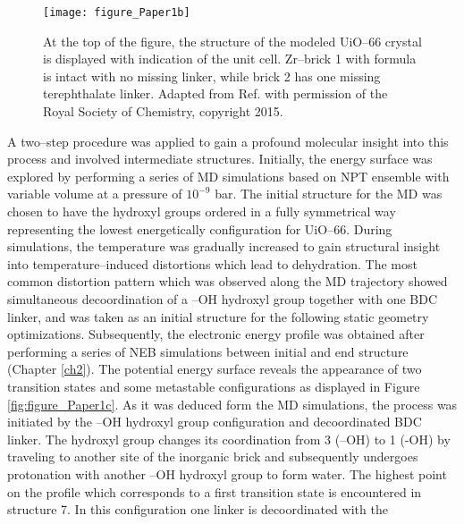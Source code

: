 \begin{figure}[!htp]
	\centering
	\texttt{[image: figure\_Paper1b]}
	\caption[At the top of the figure, the structure of the modeled UiO--66
crystal is displayed with indication of the unit cell. Zr--brick 1 with
formula \ce{[Zr6O4(OH)4(RCOO)12]} is intact with no missing linker, while
brick 2 \ce{[Zr6O6(OH)2(RCOO)10]} has one missing terephthalate linker.]{At the top of the figure, the structure of the modeled UiO--66
crystal is displayed with indication of the unit cell. Zr--brick 1 with
formula \ce{[Zr6O4(OH)4(RCOO)12]} is intact with no missing linker, while
brick 2 \ce{[Zr6O6(OH)2(RCOO)10]} has one missing terephthalate linker. Adapted
from Ref. \cite{Vandichel2015} with permission of the Royal Society of Chemistry, copyright 2015.}
	\label{fig:figure_Paper1b}
\end{figure}
\npar
A two--step procedure was applied to gain a profound molecular insight into
this process and involved intermediate structures. Initially, the energy
surface was explored by performing a series of MD simulations based on
NPT ensemble with variable volume at a pressure of $10^{-9}$
bar. The initial structure for the MD was chosen to have the hydroxyl groups
ordered in a fully symmetrical way representing the lowest energetically
configuration for UiO--66. During simulations, the temperature was gradually
increased to gain structural insight into temperature--induced distortions which
lead to dehydration. The most common distortion pattern which was observed along the MD
trajectory showed simultaneous decoordination of a 
--OH hydroxyl group together with one BDC linker, 
and was taken as an initial structure for the following static geometry optimizations. Subsequently, 
the electronic energy profile was obtained after performing a series of NEB
simulations between initial and end structure (Chapter \ref{ch2}). The potential
energy surface reveals the appearance of two transition states and some
metastable configurations as displayed in Figure \ref{fig:figure_Paper1c}.
As it was deduced form the MD simulations, the process was initiated by the
--OH hydroxyl group configuration and decoordinated BDC linker.
The hydroxyl group changes its coordination from 3 (--OH) to 1
(-OH) by traveling to another site of the inorganic brick and
subsequently undergoes protonation with another --OH hydroxyl
group to form water. The highest point on the profile which corresponds to a first transition state is encountered in structure 7. In this configuration one linker is decoordinated with the
